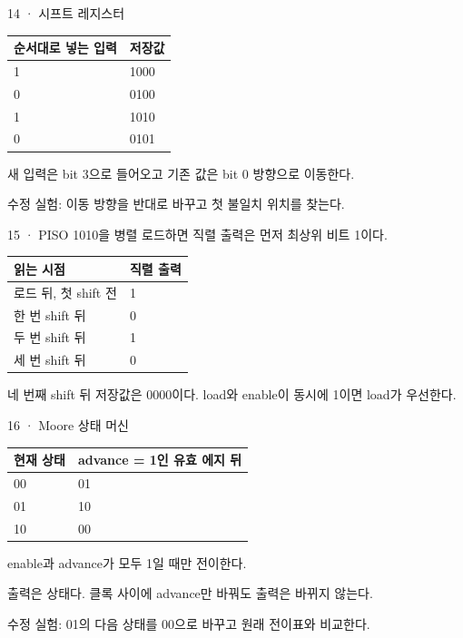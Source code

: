 \begin{frame}{14 · 시프트 레지스터}
\small
\begin{center}\renewcommand{\arraystretch}{1.55}\begin{tabular}{ll}
순서대로 넣는 입력 & 저장값\\\hline
1 & 1000\\
0 & 0100\\
1 & 1010\\
0 & 0101\\
\end{tabular}\end{center}새 입력은 bit 3으로 들어오고 기존 값은 bit 0 방향으로 이동한다.\par\vspace{0.26cm}수정 실험: 이동 방향을 반대로 바꾸고 첫 불일치 위치를 찾는다.\par
\end{frame}

\begin{frame}{15 · PISO}
\small
1010을 병렬 로드하면 직렬 출력은 먼저 최상위 비트 1이다.\par\begin{center}\renewcommand{\arraystretch}{1.55}\begin{tabular}{ll}
읽는 시점 & 직렬 출력\\\hline
로드 뒤, 첫 shift 전 & 1\\
한 번 shift 뒤 & 0\\
두 번 shift 뒤 & 1\\
세 번 shift 뒤 & 0\\
\end{tabular}\end{center}네 번째 shift 뒤 저장값은 0000이다. load와 enable이 동시에 1이면 load가 우선한다.\par
\end{frame}

\begin{frame}{16 · Moore 상태 머신}
\small
\begin{center}\renewcommand{\arraystretch}{1.55}\begin{tabular}{ll}
현재 상태 & advance = 1인 유효 에지 뒤\\\hline
00 & 01\\
01 & 10\\
10 & 00\\
\end{tabular}\end{center}enable과 advance가 모두 1일 때만 전이한다.\par\vspace{0.26cm}출력은 상태다. 클록 사이에 advance만 바꿔도 출력은 바뀌지 않는다.\par\vspace{0.26cm}수정 실험: 01의 다음 상태를 00으로 바꾸고 원래 전이표와 비교한다.\par
\end{frame}

